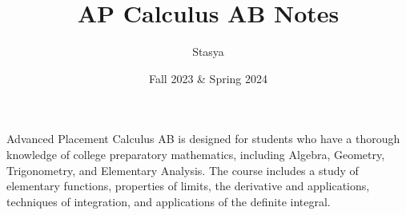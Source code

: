 \documentclass[10pt,a4paper,oneside]{book}
\title{AP Calculus AB Notes}
\author{Stasya}
\date{Fall 2023 \& Spring 2024}
\begin{document}
\maketitle
\bigbreak
\begin{center}
    Advanced Placement Calculus AB is designed for students who have a thorough knowledge of college preparatory mathematics, 
    including Algebra, Geometry, Trigonometry, and Elementary Analysis. The course includes a study of elementary functions, 
    properties of limits, the derivative and applications, techniques of integration, and applications of the definite integral.
\end{center}
\bigbreak
\tableofcontents








\end{document}
